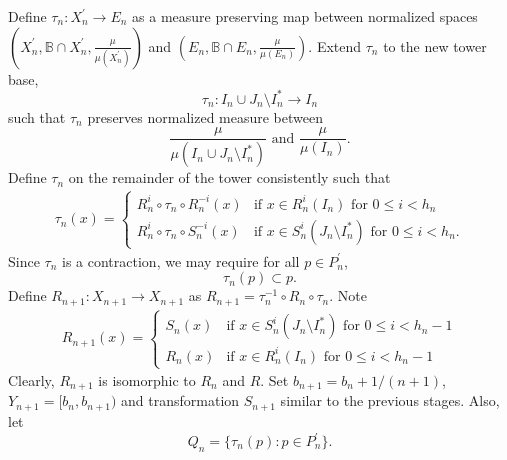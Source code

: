 \documentclass[12pt]{amsart}
\begin{document}
Define $\tau_n:X_n^{\prime}\to E_n$ as a measure preserving map between 
normalized spaces 
$(X_n^{\prime},\mathbb{B} \cap X_n^{\prime},\frac{\mu}{\mu (X_n^{\prime})})$ and 
$(E_n,\mathbb{B} \cap E_n,\frac{\mu}{\mu (E_n)})$. 
Extend $\tau_n$ to the new tower base, 
$$\tau_n:I_n \cup J_n\setminus I_n^*\to I_n$$
such that $\tau_n$ preserves normalized measure between 
$$\frac{\mu}{\mu (I_n \cup J_n\setminus I_n^*)}\mbox{ and }\frac{\mu}{\mu (I_n)}.$$
Define $\tau_n$ on the remainder of the tower consistently 
such that 
\begin{eqnarray*} 
\tau_n(x)= 
\left\{\begin{array}{ll}
R_n^{i}\circ \tau_n \circ R_n^{-i}(x) & \mbox{if $x\in R_n^i(I_n)$ for $0\leq i<h_n$} \\ 
R_n^{i}\circ \tau_n \circ S_n^{-i}(x) & \mbox{if $x\in S_n^{i}(J_n\setminus I_n^*)$ for $0\leq i<h_n$} . 
\end{array}
\right.
\end{eqnarray*}
Since $\tau_n$ is a contraction, we may require for all $p\in P_n^{\prime}$,
\[
\tau_n(p) \subset p .
\]
Define 
$R_{n+1}:X_{n+1}\to X_{n+1}$ as $R_{n+1}=\tau_n^{-1}\circ R_n\circ \tau_n$. Note 
\begin{eqnarray*} 
R_{n+1}(x)= 
\left\{\begin{array}{ll}
S_n(x) & \mbox{if $x\in S_n^{i}(J_n\setminus I_n^*)$ for $0\leq i<h_n-1$} \\ 
R_n(x) & \mbox{if $x\in R_n^{i}(I_n)$ for $0\leq i<h_n-1$} 
\end{array}
\right.
\end{eqnarray*}
Clearly, $R_{n+1}$ is isomorphic to $R_n$ and $R$.  
Set $b_{n+1} = b_n + {1}/{(n+1)}$, 
$Y_{n+1} = [b_n, b_{n+1})$ 
and transformation $S_{n+1}$ similar to the previous stages. 
Also, let 
\[
Q_n = \{ \tau_n (p) : p \in P_n^{\prime} \} . 
\]
\end{document}
